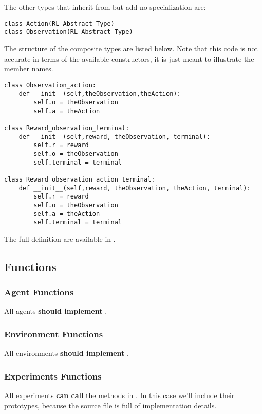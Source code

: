 \documentclass[11pt]{article}
\begin{document}
The other types that inherit from \texttt{\rat} but add no specialization are:
\begin{verbatim}
class Action(RL_Abstract_Type)
class Observation(RL_Abstract_Type)
\end{verbatim}

The structure of the composite types are listed below.  Note that this code is not accurate in terms of the available constructors, 
it is just meant to illustrate the member names.
\begin{verbatim}
class Observation_action:
    def __init__(self,theObservation,theAction):
        self.o = theObservation
        self.a = theAction

class Reward_observation_terminal:
    def __init__(self,reward, theObservation, terminal):
        self.r = reward
        self.o = theObservation
        self.terminal = terminal

class Reward_observation_action_terminal:
    def __init__(self,reward, theObservation, theAction, terminal):
        self.r = reward
        self.o = theObservation
        self.a = theAction
        self.terminal = terminal
\end{verbatim}

The full definition are available in .
\subsection{Functions}
\subsubsection{Agent Functions}
All agents \textbf{should implement} .

\subsubsection{Environment Functions}
All environments \textbf{should implement} .

\subsubsection{Experiments Functions}
All experiments \textbf{can call} the methods in .
In this case we'll include their prototypes, because the source file is full of implementation details.
\end{document}
